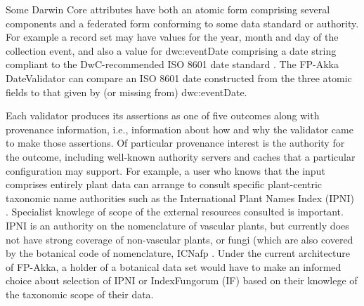\documentclass{article}
\begin{document}

Some Darwin Core attributes have both an atomic form comprising several components and a federated form conforming to some data standard or authority.  For example a record set may have values for the year, month and day of the collection event, and also a value for dwc:eventDate comprising a date string compliant to the DwC-recommended ISO 8601 date standard \citep{iso_iso_2004}. 
The FP-Akka DateValidator can compare an ISO 8601 date constructed from the three atomic fields to that given by (or missing from) dwc:eventDate.

Each validator produces its assertions as one of five outcomes along with provenance information, i.e., information about how and why the validator came to make those assertions. Of particular provenance interest is the authority for the outcome, including well-known authority servers and caches that a particular configuration may support.  For example, a user who knows that the  input  comprises entirely plant data can arrange to consult specific plant-centric taxonomic name authorities such as the International Plant Names Index (IPNI) \citep{ipni_international_2012}. 
Specialist knowlege of scope of the external resources consulted is important.  IPNI is an authority on the nomenclature of vascular plants, but currently does not have strong coverage of non-vascular plants, or fungi (which are also covered by the botanical code of nomenclature, ICNafp \citep{ICNafp2012}.  Under the current architecture of FP-Akka, a holder of a botanical data set would have to make an informed choice about selection of IPNI or IndexFungorum (IF) \citep{IF_2015} based on their knowlege of the taxonomic scope of their data.  
\end{document}
